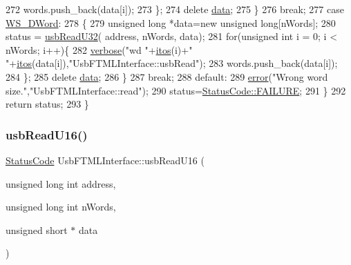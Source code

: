 \begin{DoxyCode}
272         words.push\_back(data[i]);
273       \};
274       \textcolor{keyword}{delete} \hyperlink{namespaceshell_a5ea2525995cedc3efd69ea8a7f034d1e}{data};
275     \}
276     \textcolor{keywordflow}{break};
277   \textcolor{keywordflow}{case} \hyperlink{classUsbFTMLInterface_ae0f25daa336091a5acd548aef3e9b4b4abff203c40a75d695acbf9190ae2dbe69}{WS\_DWord}:
278     \{
279       \textcolor{keywordtype}{unsigned} \textcolor{keywordtype}{long} *data=\textcolor{keyword}{new} \textcolor{keywordtype}{unsigned} \textcolor{keywordtype}{long}[nWords];
280       status = \hyperlink{classUsbFTMLInterface_aa1256fc56698bc9ed1bcf11ecc6ff766}{usbReadU32}( address, nWords, data);
281       \textcolor{keywordflow}{for}(\textcolor{keywordtype}{unsigned} \textcolor{keywordtype}{int} i = 0; i < nWords; i++)\{
282         \hyperlink{classObject_a83d2db2df682907ea1115ad721c1c4a1}{verbose}(\textcolor{stringliteral}{"wd "}+\hyperlink{Tools_8h_af330027dbdafb9a30768b3613c553e60}{itos}(i)+\textcolor{stringliteral}{" "}+\hyperlink{Tools_8h_af330027dbdafb9a30768b3613c553e60}{itos}(data[i]),\textcolor{stringliteral}{"UsbFTMLInterface::usbRead"});
283         words.push\_back(data[i]);
284       \};
285       \textcolor{keyword}{delete} \hyperlink{namespaceshell_a5ea2525995cedc3efd69ea8a7f034d1e}{data};
286     \}
287     \textcolor{keywordflow}{break};
288   \textcolor{keywordflow}{default}:
289     \hyperlink{classObject_a204a95f57818c0f811933917a30eff45}{error}(\textcolor{stringliteral}{"Wrong word size."},\textcolor{stringliteral}{"UsbFTMLInterface::read"});
290     status=\hyperlink{classStatusCode_a6f565cbeadc76d14c72f047e5e85eb4ba3da73d4c469762eb9d3c960368252b26}{StatusCode::FAILURE};
291   \}
292   \textcolor{keywordflow}{return} status;
293 \}
\end{DoxyCode}
\mbox{\label{classUsbFTMLInterface_a5fb608bce418671265b61266033cedc0}} 
\subsubsection{\texorpdfstring{usb\+Read\+U16()}{usbReadU16()}}
{\footnotesize\ttfamily \hyperlink{classStatusCode}{Status\+Code} Usb\+F\+T\+M\+L\+Interface\+::usb\+Read\+U16 (\begin{DoxyParamCaption}\item[{unsigned long int}]{address,  }\item[{unsigned long int}]{n\+Words,  }\item[{unsigned short $\ast$}]{data }\end{DoxyParamCaption})}



